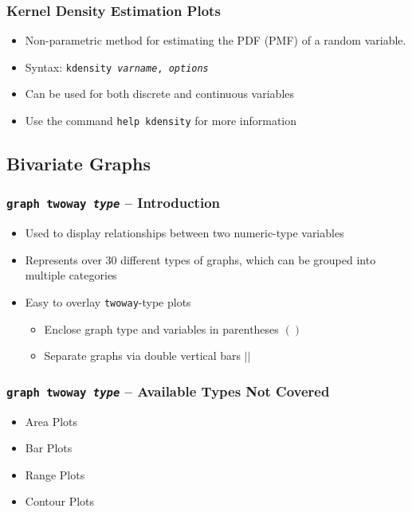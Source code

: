 \documentclass{beamer}
\begin{document}
\begin{frame}
	\frametitle{Kernel Density Estimation Plots}
	
	\begin{itemize}
		\item Non-parametric method for estimating the PDF (PMF) of a random variable.
		\item Syntax: \texttt{kdensity \textit{varname}, \textit{options}}
		\item Can be used for both discrete and continuous variables
		\item Use the command \texttt{help kdensity} for more information
	\end{itemize}
\end{frame}

\subsection{Bivariate Graphs}
\begin{frame}
	\frametitle{\texttt{graph twoway \textit{type}} -- Introduction}
	
	\begin{itemize}
		\item Used to display relationships between two numeric-type variables
		\item Represents over 30 different types of graphs, which can be grouped into multiple categories
		\item Easy to overlay \texttt{twoway}-type plots
		\begin{itemize}
			\item Enclose graph type and variables in parentheses $()$
			\item Separate graphs via double vertical bars $||$
		\end{itemize}
	\end{itemize}
	
\end{frame}

\begin{frame}
	\frametitle{\texttt{graph twoway \textit{type}} -- Available Types Not Covered}
	
	\begin{itemize}
		\item Area Plots
		\item Bar Plots
		\item Range Plots
		\item Contour Plots
	\end{itemize}	
\end{frame}
\end{document}
